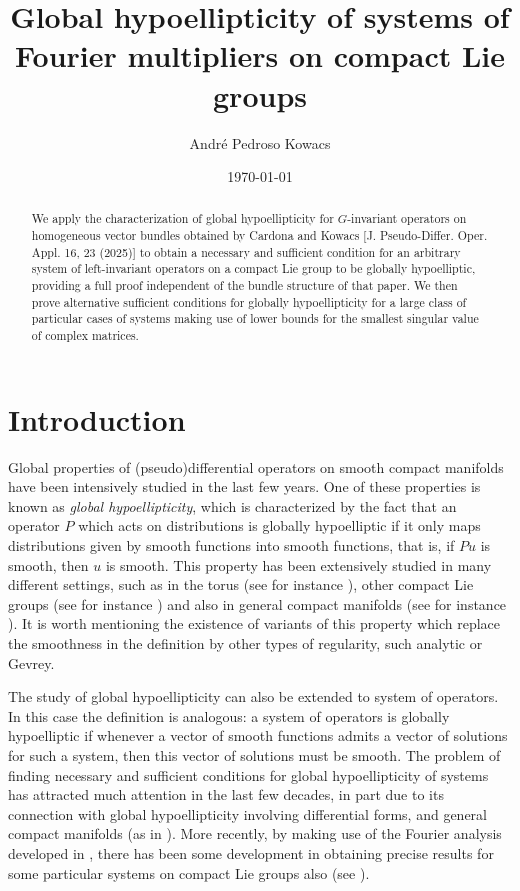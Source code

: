 \documentclass[11pt]{amsart}
\title{Global hypoellipticity of systems of Fourier multipliers on compact Lie groups}
\author[A. Kowacs]{André Pedroso Kowacs} %
\date{\today}
\numberwithin{theorem}{section}
\numberwithin{equation}{section}
\theoremstyle{definition}
\numberwithin{example}{section}
\theoremstyle{definition}
\theoremstyle{definition}
\begin{document}
\begin{abstract}
We apply the characterization of global hypoellipticity for $G$-invariant operators on homogeneous vector bundles obtained by Cardona and Kowacs [J. Pseudo-Differ. Oper. Appl. 16, 23 (2025)] to obtain a necessary and sufficient condition for an arbitrary system of left-invariant operators on a compact Lie group to be globally hypoelliptic, providing a full proof independent of the bundle structure of that paper. We then prove alternative sufficient conditions for globally hypoellipticity for a large class of particular cases of systems making use of lower bounds for the smallest singular value of complex matrices.
\end{abstract}
\maketitle
\allowdisplaybreaks

\section{Introduction}

Global properties of (pseudo)differential operators on smooth compact manifolds have been intensively studied in the last few years. One of these properties is known as {\it global hypoellipticity}, which is characterized by the fact that an operator $P$ which acts on distributions is globally hypoelliptic if it only maps distributions given by smooth functions into smooth functions, that is, if $Pu$ is smooth, then $u$ is smooth. This property has been extensively studied in many different settings, such as in the torus (see for instance  \cite{BergamascoKirilovGH,PsudoGHKirilov,PseudoTorus,GF1,GF2,GFremarks}), other compact Lie groups (see for instance  \cite{Araujo,KirilovTS,KirilovCOMP,RuzTurWirth}) and also in general compact manifolds (see for instance \cite{bergack,hounie,houniezugli,Kirilov_2020}). It is worth mentioning the existence of variants of this property which replace the smoothness in the definition by other types of regularity, such analytic or Gevrey.

The study of global hypoellipticity can also be extended to system of operators. In this case the definition is analogous: a system of operators is globally hypoelliptic if whenever a vector of smooth functions admits a vector of solutions for such a system, then this vector of solutions must be smooth. The problem of finding necessary and sufficient conditions for global hypoellipticity of systems has attracted much attention in the last few decades, in part due to its connection with global hypoellipticity involving differential forms,
and general compact manifolds (as in \cite{BergamascoGH,triangulariz,overdetermined}). More recently, by making use of the Fourier analysis developed in \cite{Ruz}, there has been some development in obtaining precise results for some particular systems on compact Lie groups also (see \cite{diag-systems}).
\end{document}
